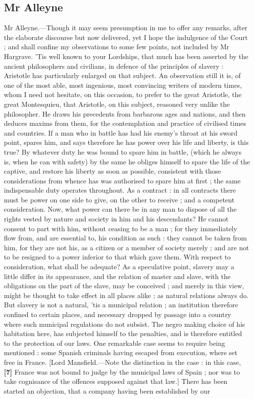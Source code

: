 \documentclass[a4paper]{article}
\begin{document}
\subsection{Mr Alleyne}
Mr Alleyne.---Though it may seem presumption in me to offer any remarks, after the elaborate discourse but now delivered, yet I hope the indulgence of the Court ; and shall confine my observations to some few points, not included by Mr Hargrave. 'Tis well known to your Lordships, that much has been asserted by the ancient philosophers and civilians, in defence of the principles of slavery : Aristotle has particularly enlarged on that subject. An observation still it is, of one of the most able, most ingenious, most convincing writers of modern times, whom I need not hesitate, on this occasion, to prefer to the great Aristotle, the great Montesquieu, that Aristotle, on this subject, reasoned very unlike the philosopher. He draws his precedents from barbarous ages and nations, and then deduces maxims from them, for the contemplation and practice of civilised times and countries. If a man who in battle has had his enemy's throat at his sword point, spares him, and says therefore he has power over his life and liberty, is this true? By whatever duty he was bound to spare him in battle, (which he always is, when he can with safety) by the same he obliges himself to spare the life of the captive, and restore his liberty as soon as possible, consistent with those considerations from whence has was authorised to spare him at first ; the same indispensable duty operates throughout. As a contract : in all contracts there must be power on one side to give, on the other to receive ; and a competent consideration. Now, what power can there be in any man to dispose of all the rights vested by nature and society in him and his descendants? He cannot consent to part with him, without ceasing to be a man ; for they immediately flow from, and are essential to, his condition as such : they cannot be taken from him, for they are not his, as a citizen or a member of society merely ; and are not to be resigned to a power inferior to that which gave them. With respect to consideration, what shall be adequate? As a speculative point, slavery may a little differ in its appearance, and the relation of master and slave, with the obligations on the part of the slave, may be conceived ; and merely in this view, might be thought to take effect in all places alike ; as natural relations always do. But slavery is not a natural, 'tis a municipal relation ; an institution therefore confined to certain places, and necessary dropped by passage into a country where such municipal regulations do not subsist. The negro making choice of his habitation here, has subjected himself to the penalties, and is therefore entitled to the protection of our laws. One remarkable case seems to require being mentioned : some Spanish criminals having escaped from execution, where set free in France. [Lord Mansfield.---Note the distinction in the case : in this case, \textbf{[7]} France was not bound to judge by the municipal laws of Spain ; nor was to take cognisance of the offences supposed against that law.] There has been started an objection, that a company having been established by our 
\end{document}
